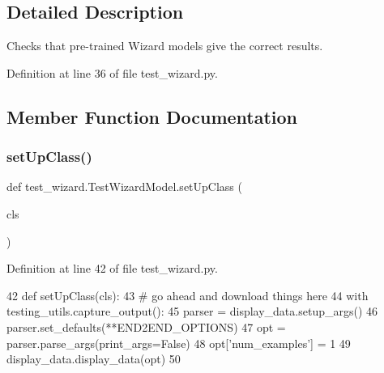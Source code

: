\subsection{Detailed Description}
\begin{DoxyVerb}Checks that pre-trained Wizard models give the correct results.
\end{DoxyVerb}
 

Definition at line 36 of file test\+\_\+wizard.\+py.



\subsection{Member Function Documentation}
\mbox{\label{classtest__wizard_1_1TestWizardModel_a2b3661d3b4129ecb38ac3c5fe47232e1}} 
\subsubsection{\texorpdfstring{set\+Up\+Class()}{setUpClass()}}
{\footnotesize\ttfamily def test\+\_\+wizard.\+Test\+Wizard\+Model.\+set\+Up\+Class (\begin{DoxyParamCaption}\item[{}]{cls }\end{DoxyParamCaption})}



Definition at line 42 of file test\+\_\+wizard.\+py.


\begin{DoxyCode}
42     \textcolor{keyword}{def }setUpClass(cls):
43         \textcolor{comment}{# go ahead and download things here}
44         with testing\_utils.capture\_output():
45             parser = display\_data.setup\_args()
46             parser.set\_defaults(**END2END\_OPTIONS)
47             opt = parser.parse\_args(print\_args=\textcolor{keyword}{False})
48             opt[\textcolor{stringliteral}{'num\_examples'}] = 1
49             display\_data.display\_data(opt)
50 
\end{DoxyCode}
\mbox{\label{classtest__wizard_1_1TestWizardModel_a25fdc3cdc736bc273eaeed0019dfaf5b}} 
